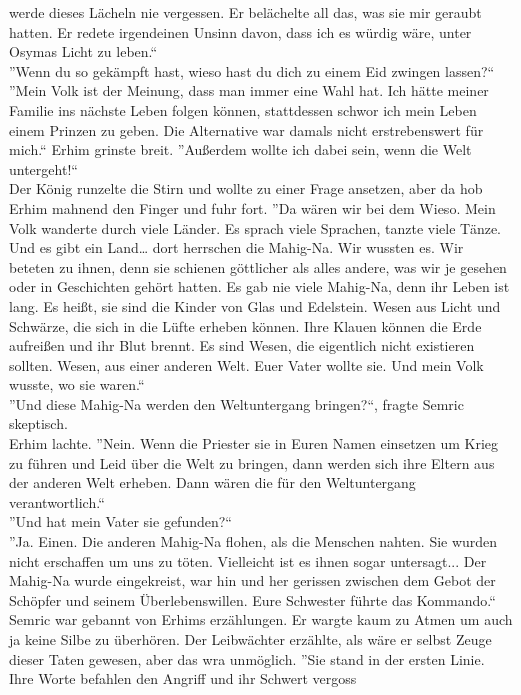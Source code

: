 werde dieses Lächeln nie vergessen. Er belächelte all das, was sie mir geraubt hatten. Er redete 
irgendeinen Unsinn davon, dass ich es würdig wäre, unter Osymas Licht zu leben.``\\
''Wenn du so gekämpft hast, wieso hast du dich zu einem Eid zwingen lassen?``\\
''Mein Volk ist der Meinung, dass man immer eine Wahl hat. Ich hätte meiner Familie ins nächste 
Leben folgen können, stattdessen schwor ich mein Leben einem Prinzen zu geben. Die Alternative war 
damals nicht erstrebenswert für mich.`` Erhim grinste breit. ''Außerdem wollte ich dabei sein, wenn 
die Welt untergeht!``\\
Der König runzelte die Stirn und wollte zu einer Frage ansetzen, aber da hob Erhim mahnend den 
Finger und fuhr fort. ''Da wären wir bei dem Wieso. Mein Volk wanderte durch viele Länder. Es 
sprach viele Sprachen, tanzte viele Tänze. Und es gibt ein Land… dort herrschen die Mahig-Na. Wir 
wussten es. Wir beteten zu ihnen, denn sie schienen göttlicher als alles andere, was wir je gesehen 
oder in Geschichten gehört hatten. Es gab nie viele Mahig-Na, denn ihr Leben ist lang. Es heißt, sie 
sind die Kinder von Glas und Edelstein. Wesen aus Licht und Schwärze, die sich in die Lüfte erheben 
können. Ihre Klauen können die Erde aufreißen und ihr Blut brennt. Es sind Wesen, die eigentlich 
nicht existieren sollten. Wesen, aus einer anderen Welt. Euer Vater wollte sie. Und mein Volk 
wusste, wo sie waren.``\\
''Und diese Mahig-Na werden den Weltuntergang bringen?``, fragte Semric skeptisch.\\
Erhim lachte. ''Nein. Wenn die Priester sie in Euren Namen einsetzen um Krieg zu führen und Leid 
über die Welt zu bringen, dann werden sich ihre Eltern aus der anderen Welt erheben. Dann wären die 
für den Weltuntergang verantwortlich.``\\
''Und hat mein Vater sie gefunden?``\\
''Ja. Einen. Die anderen Mahig-Na flohen, als die Menschen nahten. Sie wurden nicht erschaffen um 
uns zu töten. Vielleicht ist es ihnen sogar untersagt... Der Mahig-Na wurde eingekreist, war hin 
und her gerissen zwischen dem Gebot der Schöpfer und seinem Überlebenswillen. Eure Schwester führte 
das Kommando.``\\
Semric war gebannt von Erhims erzählungen. Er wargte kaum zu Atmen um auch ja keine Silbe zu 
überhören. Der Leibwächter erzählte, als wäre er selbst Zeuge dieser Taten gewesen, aber das wra 
unmöglich. ''Sie stand in der ersten Linie. Ihre Worte befahlen den Angriff und ihr Schwert vergoss 
